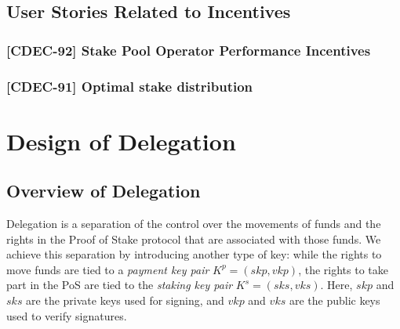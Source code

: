 \documentclass[11pt,a4paper]{article}
\begin{document}

\subsection{User Stories Related to
Incentives}\label{user-stories-related-to-incentives}

\subsubsection{{[}CDEC-92{]} Stake Pool Operator Performance
Incentives}\label{cdec-92-stake-pool-operator-performance-incentives}

\subsubsection{{[}CDEC-91{]} Optimal stake
distribution}\label{cdec-91-optimal-stake-distribution}


\section{Design of Delegation}\label{design-of-delegation}

\subsection{Overview of Delegation}\label{overview-of-delegation}

Delegation is a separation of the control over the movements of funds
and the rights in the Proof of Stake protocol that are associated with
those funds. We achieve this separation by introducing another type of
key: while the rights to move funds are tied to a \emph{payment key
pair} \(K^p=(skp, vkp)\), the rights to take part in the PoS are tied to
the \emph{staking key pair} \(K^s=(sks, vks)\). Here, \(skp\) and
\(sks\) are the private keys used for signing, and \(vkp\) and \(vks\)
are the public keys used to verify signatures.
\end{document}
